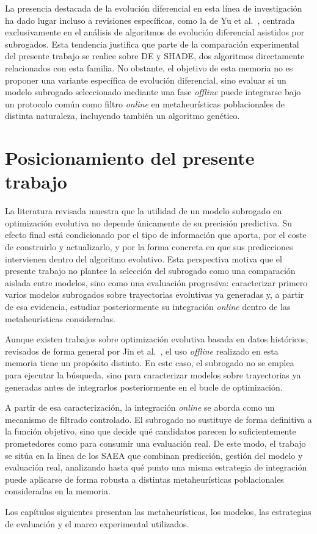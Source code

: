 La presencia destacada de la evolución diferencial en esta línea de investigación ha dado lugar incluso a revisiones específicas, como la de Yu et al.~\cite{yu2025sade}, centrada exclusivamente en el análisis de algoritmos de evolución diferencial asistidos por subrogados. Esta tendencia justifica que parte de la comparación experimental del presente trabajo se realice sobre DE y SHADE, dos algoritmos directamente relacionados con esta familia. No obstante, el objetivo de esta memoria no es proponer una variante específica de evolución diferencial, sino evaluar si un modelo subrogado seleccionado mediante una fase \textit{offline} puede integrarse bajo un protocolo común como filtro \textit{online} en metaheurísticas poblacionales de distinta naturaleza, incluyendo también un algoritmo genético.

\section{Posicionamiento del presente trabajo}
\label{sec:estado_posicionamiento}

La literatura revisada muestra que la utilidad de un modelo subrogado en
optimización evolutiva no depende únicamente de su precisión predictiva. Su
efecto final está condicionado por el tipo de información que aporta, por el
coste de construirlo y actualizarlo, y por la forma concreta en que sus
predicciones intervienen dentro del algoritmo evolutivo. Esta perspectiva
motiva que el presente trabajo no plantee la selección del subrogado como una
comparación aislada entre modelos, sino como una evaluación progresiva:
caracterizar primero varios modelos subrogados sobre trayectorias evolutivas ya
generadas y, a partir de esa evidencia, estudiar posteriormente su integración
\textit{online} dentro de las metaheurísticas consideradas.

Aunque existen trabajos sobre optimización evolutiva basada en datos
históricos, revisados de forma general por Jin et
al.~\cite{jin2019datadriven}, el uso \textit{offline} realizado en esta memoria
tiene un propósito distinto. En este caso, el subrogado no se emplea para
ejecutar la búsqueda, sino para caracterizar modelos sobre trayectorias ya
generadas antes de integrarlos posteriormente en el bucle de optimización.

A partir de esa caracterización, la integración \textit{online} se aborda como
un mecanismo de filtrado controlado. El subrogado no sustituye de forma
definitiva a la función objetivo, sino que decide qué candidatos parecen lo
suficientemente prometedores como para consumir una evaluación real. De este
modo, el trabajo se sitúa en la línea de los SAEA que combinan predicción,
gestión del modelo y evaluación real, analizando hasta qué punto una misma
estrategia de integración puede aplicarse de forma robusta a distintas
metaheurísticas poblacionales consideradas en la memoria.

Los capítulos siguientes presentan las metaheurísticas, los modelos, las estrategias de evaluación y el marco experimental utilizados.

